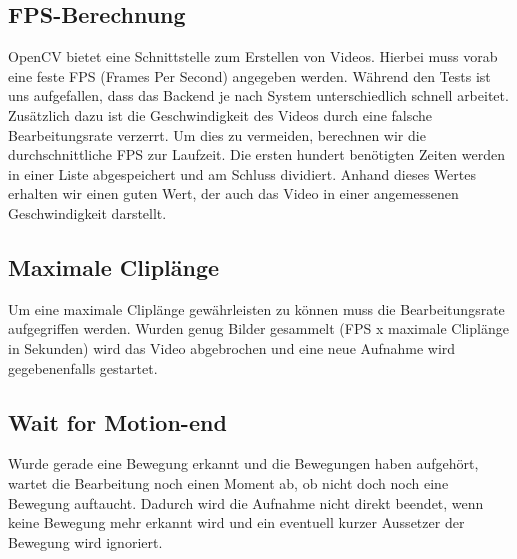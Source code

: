 \subsection{FPS-Berechnung}
OpenCV bietet eine Schnittstelle zum Erstellen von Videos. Hierbei muss vorab eine feste FPS (Frames Per Second) angegeben werden. Während den Tests ist uns aufgefallen, dass das Backend je nach System unterschiedlich schnell arbeitet. Zusätzlich dazu ist die Geschwindigkeit des Videos durch eine falsche Bearbeitungsrate verzerrt. Um dies zu vermeiden, berechnen wir die durchschnittliche FPS zur Laufzeit. Die ersten hundert benötigten Zeiten werden in einer Liste abgespeichert und am Schluss dividiert. Anhand dieses Wertes erhalten wir einen guten Wert, der auch das Video in einer angemessenen Geschwindigkeit darstellt.
\subsection{Maximale Cliplänge}
Um eine maximale Cliplänge gewährleisten zu können muss die Bearbeitungsrate aufgegriffen werden. Wurden genug Bilder gesammelt (FPS x maximale Cliplänge in Sekunden) wird das Video abgebrochen und eine neue Aufnahme wird gegebenenfalls gestartet.
\subsection{Wait for Motion-end}
Wurde gerade eine Bewegung erkannt und die Bewegungen haben aufgehört, wartet die Bearbeitung noch einen Moment ab, ob nicht doch noch eine Bewegung auftaucht. Dadurch wird die Aufnahme nicht direkt beendet, wenn keine Bewegung mehr erkannt wird und ein eventuell kurzer Aussetzer der Bewegung wird ignoriert.
